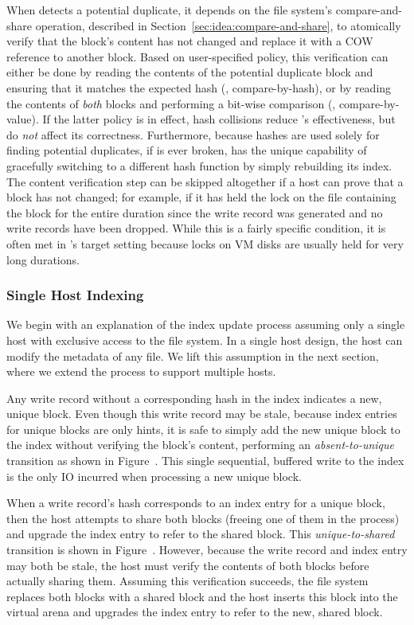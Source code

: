When \DeDe detects a potential duplicate, it depends on the file
system's compare-and-share operation, described in
Section~\ref{sec:idea:compare-and-share}, to atomically verify that
the block's content has not changed and replace it with a COW
reference to another block.  Based on user-specified policy, this
verification can either be done by reading the contents of the
potential duplicate block and ensuring that it matches the expected
hash (\ie, compare-by-hash), or by reading the contents of \emph{both}
blocks and performing a bit-wise comparison (\ie, compare-by-value).
If the latter policy is in effect, hash collisions reduce \DeDe's
effectiveness, but do \emph{not} affect its correctness.  Furthermore,
because hashes are used solely for finding potential duplicates, if
\shaone is ever broken, \DeDe has the unique capability of gracefully
switching to a different hash function by simply rebuilding its index.
The content verification step can be skipped altogether if a host can
prove that a block has not changed; for example, if it has held the
lock on the file containing the block for the entire duration since
the write record was generated and no write records have been dropped.
While this is a fairly specific condition, it is often met in \DeDe's
target setting because locks on VM disks are usually held for very
long durations.

\subsubsection{Single Host Indexing}

We begin with an explanation of the index update process assuming only
a single host with exclusive access to the file system.  In a single
host design, the host can modify the metadata of any file.  We lift
this assumption in the next section, where we extend the process to
support multiple hosts.

Any write record without a corresponding hash in the index indicates a
new, unique block.  Even though this write record may be stale,
because index entries for unique blocks are only hints, it is
safe to simply add the new unique block to the index without verifying
the block's content, performing an \emph{absent-to-unique}
transition as shown in
Figure~.  This single
sequential, buffered write to the index is the only IO incurred when
processing a new unique block.

When a write record's hash corresponds to an index entry for a
unique block, then the host attempts to share both blocks (freeing one
of them in the process) and upgrade the index entry to refer to the
shared block.  This \emph{unique-to-shared} transition is shown in
Figure~.  However,
because the write record and index entry may both be stale,
the host must verify the contents of both blocks before actually
sharing them.  Assuming this verification succeeds, the file system
replaces both blocks with a shared block and the host inserts
this block into the virtual arena and upgrades the index entry to
refer to the new, shared block.

